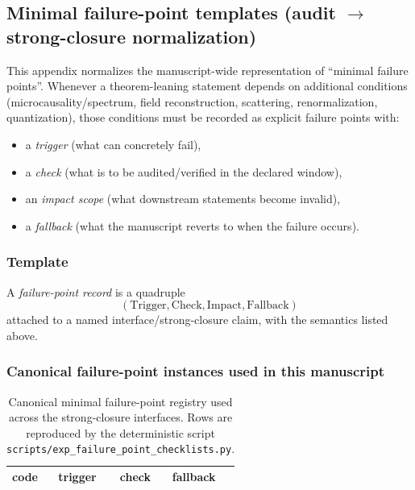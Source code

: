 \subsection{Minimal failure-point templates (audit $\rightarrow$ strong-closure normalization)}
\label{app:minimal_failure_point_templates}

\AuditTag This appendix normalizes the manuscript-wide representation of ``minimal failure points''.
Whenever a theorem-leaning statement depends on additional conditions (microcausality/spectrum, field reconstruction, scattering, renormalization, quantization), those conditions must be recorded as explicit failure points with:
\begin{itemize}
\item a \emph{trigger} (what can concretely fail),
\item a \emph{check} (what is to be audited/verified in the declared window),
\item an \emph{impact scope} (what downstream statements become invalid),
\item a \emph{fallback} (what the manuscript reverts to when the failure occurs).
\end{itemize}

\subsubsection{Template}
\begin{definition}
\label{def:failure_point_record_template}
\MathTag A \emph{failure-point record} is a quadruple
\[
(\mathrm{Trigger},\mathrm{Check},\mathrm{Impact},\mathrm{Fallback})
\]
attached to a named interface/strong-closure claim, with the semantics listed above.
\end{definition}

\subsubsection{Canonical failure-point instances used in this manuscript}

\begin{table}[H]
\centering
\scriptsize
\setlength{\tabcolsep}{6pt}
\renewcommand{\arraystretch}{1.15}
\begin{tabular}{p{0.7cm} p{3.4cm} p{3.6cm} p{3.6cm}}
\toprule
code & trigger & check & fallback \\
\midrule
%
\end{tabular}
\caption{Canonical minimal failure-point registry used across the strong-closure interfaces. Rows are reproduced by the deterministic script \texttt{scripts/exp\_failure\_point\_checklists.py}.}
\label{tab:failure_point_registry}
\end{table}

